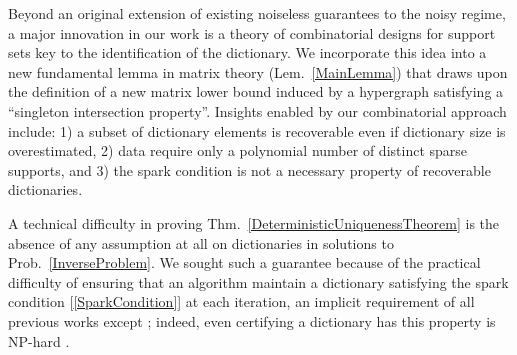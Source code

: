 \documentclass[9pt,twocolumn]{pnas-new}
\renewcommand{\eqref}[1]{\textnormal{[\ref{#1}]}}
\begin{document}




Beyond an original extension of existing noiseless guarantees \cite{Hillar15} to the noisy regime, a major innovation in our work is a theory of combinatorial designs for support sets key to the identification of the dictionary. We incorporate this idea into a new fundamental lemma in matrix theory (Lem.~\ref{MainLemma}) that draws upon the definition of a new matrix lower bound induced by a hypergraph satisfying a ``singleton intersection property''. Insights enabled by our combinatorial approach include: 1) a subset of dictionary elements is recoverable even if dictionary size is overestimated, 2) data require only a polynomial number of distinct sparse supports, and 3) the spark condition is not a necessary property of recoverable dictionaries. 

A technical difficulty in proving Thm.~\ref{DeterministicUniquenessTheorem} is the absence of any assumption at all on dictionaries in solutions to Prob.~\ref{InverseProblem}. We sought such a guarantee because of the practical difficulty of ensuring that an algorithm maintain a dictionary satisfying the spark condition \eqref{SparkCondition} at each iteration, an implicit requirement of all previous works except \cite{Hillar15}; indeed, even certifying a dictionary has this property is NP-hard \cite{tillmann2014computational}.
\end{document}
